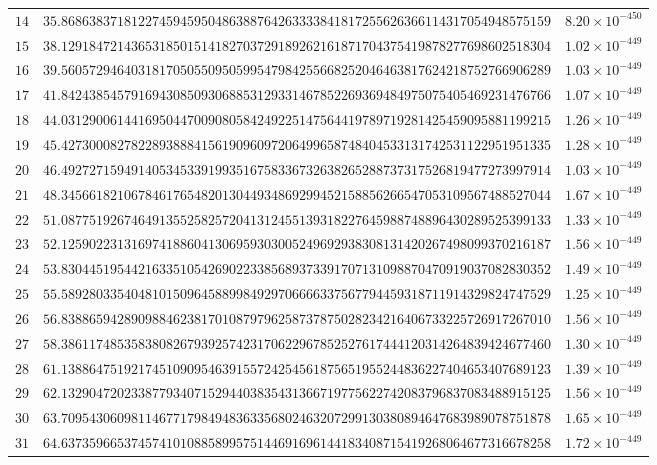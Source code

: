 \documentclass[12pt,reqno]{amsart}
\theoremstyle{plain}
\theoremstyle{definition}
\theoremstyle{remark}
\begin{document}
\begin{longtable}{clc}
$14$ & $35.8686383718122745945950486388764263333841817255626366114317054948575159$ & $8.20 \times 10^{-450}$ \\
$15$ & $38.1291847214365318501514182703729189262161871704375419878277698602518304$ & $1.02 \times 10^{-449}$ \\
$16$ & $39.5605729464031817050550950599547984255668252046463817624218752766906289$ & $1.03 \times 10^{-449}$ \\
$17$ & $41.8424385457916943085093068853129331467852269369484975075405469231476766$ & $1.07 \times 10^{-449}$ \\
$18$ & $44.0312900614416950447009080584249225147564419789719281425459095881199215$ & $1.26 \times 10^{-449}$ \\
$19$ & $45.4273000827822893888415619096097206499658748404533131742531122951951335$ & $1.28 \times 10^{-449}$ \\
$20$ & $46.4927271594914053453391993516758336732638265288737317526819477273997914$ & $1.03 \times 10^{-449}$ \\
$21$ & $48.3456618210678461765482013044934869299452158856266547053109567488527044$ & $1.67 \times 10^{-449}$ \\
$22$ & $51.0877519267464913552582572041312455139318227645988748896430289525399133$ & $1.33 \times 10^{-449}$ \\
$23$ & $52.1259022313169741886041306959303005249692938308131420267498099370216187$ & $1.56 \times 10^{-449}$ \\
$24$ & $53.8304451954421633510542690223385689373391707131098870470919037082830352$ & $1.49 \times 10^{-449}$ \\
$25$ & $55.5892803354048101509645889984929706666337567794459318711914329824747529$ & $1.25 \times 10^{-449}$ \\
$26$ & $56.8388659428909884623817010879796258737875028234216406733225726917267010$ & $1.56 \times 10^{-449}$ \\
$27$ & $58.3861174853583808267939257423170622967852527617444120314264839424677460$ & $1.30 \times 10^{-449}$ \\
$28$ & $61.1388647519217451090954639155724254561875651955244836227404653407689123$ & $1.39 \times 10^{-449}$ \\
$29$ & $62.1329047202338779340715294403835431366719775622742083796837083488915125$ & $1.56 \times 10^{-449}$ \\
$30$ & $63.7095430609811467717984948363356802463207299130380894647683989078751878$ & $1.65 \times 10^{-449}$ \\
$31$ & $64.6373596653745741010885899575144691696144183408715419268064677316678258$ & $1.72 \times 10^{-449}$ \\

\end{longtable}
\end{document}
